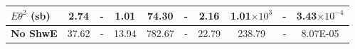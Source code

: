 \begin{table}[!hb]
\begin{tabular}{|l|ccc|ccc|ccc|}
\textbf{$E\theta^2$ (sb)}  & 2.74              & -                                                              & 1.01                                      & 74.30              & -                                                               & 2.16                                       & 1.01$\times 10^3$          & - & 3.43$\times 10^{-4}$                                  \\\hline\hline
\textbf{No ShwE}  & 37.62             & -                                                           & 13.94                                     & 782.67             & -                                                            & 22.79                                      & 238.79            & -                                                              & 8.07E-05   \\\hline
\end{tabular}
\label{tab:CutflowTableSignal}
\end{table}

